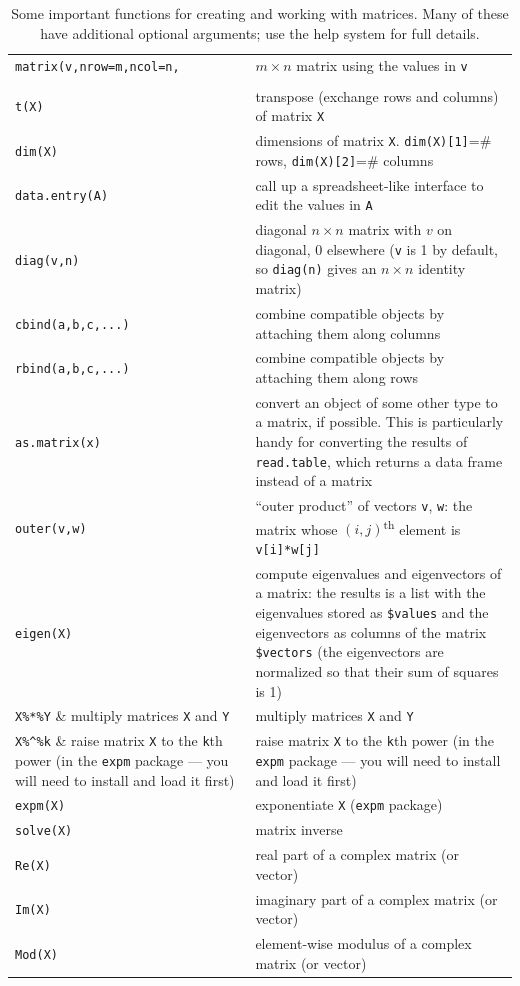 \documentclass[11pt]{article}\usepackage[]{graphicx}\usepackage[]{color}
\newcommand{\code}[1]{{\tt #1}}
\numberwithin{exercise}{section}
\begin{document}
\begin{table}[t]
\begin{tabular}{p{125pt}p{290pt}}
\hline
\code{matrix(v,nrow=m,ncol=n,} & $m \times n$ matrix using the values in \code{v} \\
\qquad \code{byrow=FALSE)} & \\
\code{t(X)} & transpose (exchange rows and columns) of matrix \code{X} \\
\code{dim(X)} & dimensions of matrix \code{X}. \code{dim(X)[1]}=\# rows, \code{dim(X)[2]}=\# columns \\
\code{data.entry(A)} & call up a spreadsheet-like interface to edit the values in \code{A} \\
\code{diag(v,n)} & diagonal $n \times n$ matrix with $v$ on diagonal, 0 elsewhere 
(\code{v} is 1 by default, so \code{diag(n)} gives an $n \times n$ identity matrix)\\
\code{cbind(a,b,c,...)} & combine compatible objects by attaching them along columns \\
\code{rbind(a,b,c,...)} & combine compatible objects by attaching them along rows \\
\code{as.matrix(x)} & convert an object of some other type to a matrix, if possible.  This is particularly handy for converting the results of \code{read.table}, which returns a data frame instead of a matrix \\
\code{outer(v,w)} & ``outer product'' of vectors \code{v}, \code{w}: the matrix whose 
$(i,j)$\textsuperscript{th}
element is \code{v[i]*w[j]} \\
\code{eigen(X)} & compute eigenvalues and eigenvectors of a matrix: the results is a list with the eigenvalues stored as \verb+$values+ and the eigenvectors as columns of the
matrix \verb+$vectors+ (the eigenvectors are normalized so that their sum of squares is 1) \\
\verb+X%*%Y+ & multiply matrices \code{X} and \code{Y} \\
\verb+X%^%k+ & raise matrix \code{X} to the \code{k}th power (in the \code{expm} package --- you will need to install and load it first) \\
\code{expm(X)} & exponentiate \code{X} (\code{expm} package) \\
\code{solve(X)} & matrix inverse \\
\code{Re(X)} & real part of a complex matrix (or vector) \\
\code{Im(X)} & imaginary part of a complex matrix (or vector) \\
\code{Mod(X)} & element-wise modulus of a complex matrix (or vector)  \\
\hline
\end{tabular}
\caption{Some important functions for creating and working with matrices. Many
of these have additional optional arguments; use the help system for full details.}
\label{MatrixFunctions}
\end{table}
\end{document}

